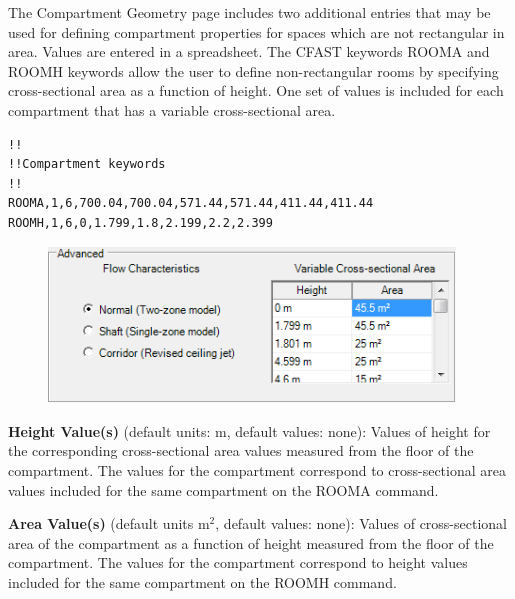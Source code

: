 The Compartment Geometry page includes two additional entries that may be used for defining compartment properties for spaces which are not rectangular in area.  Values are entered in a spreadsheet. The CFAST keywords ROOMA and ROOMH keywords allow the user to define non-rectangular rooms by specifying cross-sectional area as a function of height. One set of values is included for each compartment that has a variable cross-sectional area.

\begin{lstlisting}
!!
!!Compartment keywords
!!
ROOMA,1,6,700.04,700.04,571.44,571.44,411.44,411.44
ROOMH,1,6,0,1.799,1.8,2.199,2.2,2.399
\end{lstlisting}

\begin{figure}[h!]
\begin{center}
\includegraphics[width=4.25in]{FIGURES/Input_File/Variable_Area}
\end{center}
\end{figure}

\textbf{Height Value(s)} (default units: m, default values: none): Values of height for the corresponding cross-sectional area values measured from the floor of the compartment. The values for the compartment correspond to cross-sectional area values included for the same compartment on the ROOMA command.

\textbf{Area Value(s)} (default units m$^2$, default values: none): Values of cross-sectional area of the compartment as a function of height measured from the floor of the compartment. The values for the compartment correspond to height values included for the same compartment on the ROOMH command.

